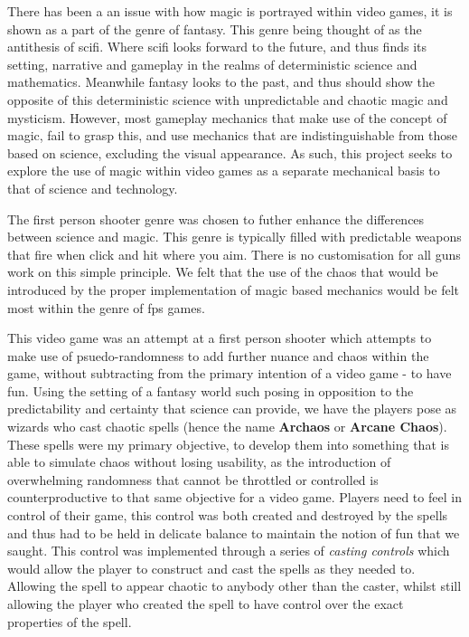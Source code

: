 \documentclass[12pt,a4paper]{report}
\begin{document}
There has been a an issue with how magic is portrayed within video games, it is shown as a part of the genre of \gls{fantasy}. This genre being thought of as the antithesis of \gls{scifi}. Where \gls{scifi} looks forward to the future, and thus finds its setting, narrative and gameplay in the realms of deterministic science and mathematics. Meanwhile \gls{fantasy} looks to the past, and thus should show the opposite of this deterministic science with unpredictable and chaotic magic and mysticism. However, most gameplay mechanics that make use of the concept of magic, fail to grasp this, and use mechanics that are indistinguishable from those based on science, excluding the visual appearance. As such, this project seeks to explore the use of magic within video games as a separate mechanical basis to that of science and technology.

The first person shooter genre was chosen to futher enhance the differences between science and magic. This genre is typically filled with predictable weapons that fire when click and hit where you aim. There is no customisation for all guns work on this simple principle. We felt that the use of the chaos that would be introduced by the proper implementation of magic based mechanics would be felt most within the genre of \gls{fps} games.

This video game was an attempt at a first person shooter which attempts to make use of psuedo-randomness to add further nuance and chaos within the game, without subtracting from the primary intention of a video game - to have fun. Using the setting of a fantasy world such posing in opposition to the predictability and certainty that science can provide, we have the players pose as wizards who cast chaotic spells (hence the name \textbf{Archaos} or \textbf{Arcane Chaos}). These spells were my primary objective, to develop them into something that is able to simulate chaos without losing usability, as the introduction of overwhelming randomness that cannot be throttled or controlled is counterproductive to that same objective for a video game. Players need to feel in control of their game, this control was both created and destroyed by the spells and thus had to be held in delicate balance to maintain the notion of fun that we saught. This control was implemented through a series of \textit{casting controls} which would allow the player to construct and cast the spells as they needed to. Allowing the spell to appear chaotic to anybody other than the caster, whilst still allowing the player who created the spell to have control over the exact properties of the spell.
\end{document}
